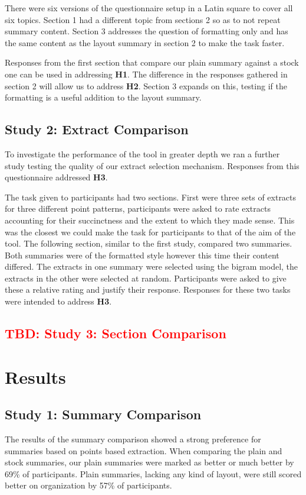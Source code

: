       There were six versions of the questionnaire setup in a Latin square to cover all six topics. Section 1 had a different topic from sections 2 so as to not repeat summary content. Section 3 addresses the question of formatting only and has the same content as the layout summary in section 2 to make the task faster.

      Responses from the first section that compare our plain summary against a stock one can be used in addressing \textbf{H1}. The difference in the responses gathered in section 2 will allow us to address \textbf{H2}. Section 3 expands on this, testing if the formatting is a useful addition to the layout summary.

    \tocless\subsection{Study 2: Extract Comparison}
      To investigate the performance of the tool in greater depth we ran a further study testing the quality of our extract selection mechanism. Responses from this questionnaire addressed \textbf{H3}.

      The task given to participants had two sections. First were three sets of extracts for three different point patterns, participants were asked to rate extracts accounting for their succinctness and the extent to which they made sense. This was the closest we could make the task for participants to that of the aim of the tool. The following section, similar to the first study, compared two summaries. Both summaries were of the formatted style however this time their content differed. The extracts in one summary were selected using the bigram model, the extracts in the other were selected at random. Participants were asked to give these a relative rating and justify their response. Responses for these two tasks were intended to address \textbf{H3}.

    \tocless\subsection{\textcolor{red}{TBD: Study 3: Section Comparison}}

  \section{Results}
    \tocless\subsection{Study 1: Summary Comparison}
      The results of the summary comparison showed a strong preference for summaries based on points based extraction. When comparing the plain and stock summaries, our plain summaries were marked as better or much better by 69\% of participants. Plain summaries, lacking any kind of layout, were still scored better on organization by 57\% of participants.

